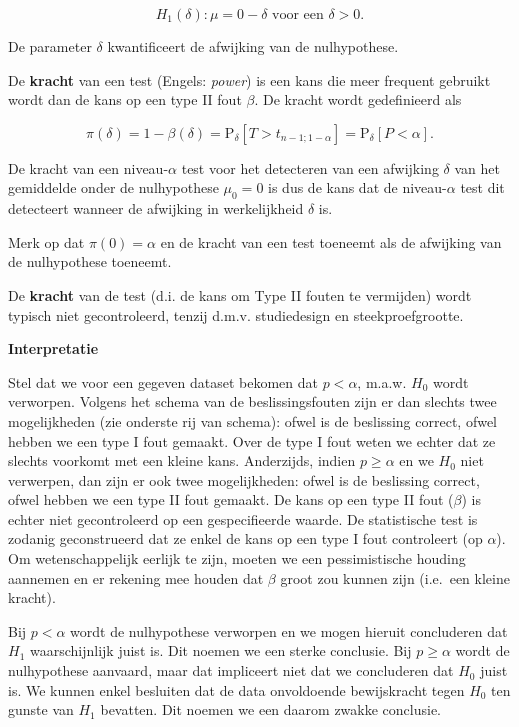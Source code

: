 \documentclass[
  12pt,dutch]{book}
\theoremstyle{definition}
\theoremstyle{definition}
\theoremstyle{definition}
\theoremstyle{definition}
\theoremstyle{remark}
\begin{document}
\[H_1(\delta): \mu=0-\delta \text{ voor een }\delta>0.\]

De parameter \(\delta\) kwantificeert de afwijking van de nulhypothese.

De \textbf{kracht} van een test (Engels: \emph{power}) is een kans die meer frequent gebruikt wordt dan de kans op een type II fout \(\beta\). De kracht wordt gedefinieerd als

\[\pi(\delta) = 1-\beta(\delta) = \text{P}_\delta\left[T>t_{n-1;1-\alpha}\right]=\text{P}_\delta\left[P<\alpha\right].\]

De kracht van een niveau-\(\alpha\) test voor het detecteren van een afwijking \(\delta\) van het gemiddelde onder de nulhypothese \(\mu_0=0\) is dus de kans dat de niveau-\(\alpha\) test dit detecteert wanneer de afwijking in werkelijkheid \(\delta\) is.

Merk op dat \(\pi(0)=\alpha\) en de kracht van een test toeneemt als de afwijking van de nulhypothese toeneemt.

De \textbf{kracht} van de test (d.i. de kans om Type II fouten te vermijden) wordt typisch niet gecontroleerd, tenzij d.m.v. studiedesign en steekproefgrootte.

\textbf{Interpretatie}

Stel dat we voor een gegeven dataset bekomen dat \(p<\alpha\), m.a.w. \(H_0\) wordt verworpen. Volgens het schema van de beslissingsfouten zijn er dan slechts twee mogelijkheden (zie onderste rij van schema): ofwel is de beslissing correct, ofwel hebben we een type I fout gemaakt. Over de type I fout weten we echter dat ze slechts voorkomt met een kleine kans.
Anderzijds, indien \(p\geq \alpha\) en we \(H_0\) niet verwerpen, dan zijn er ook twee mogelijkheden: ofwel is de beslissing correct, ofwel hebben we een type II fout gemaakt. De kans op een type II fout (\(\beta\)) is echter niet gecontroleerd op een gespecifieerde waarde. De statistische test is zodanig geconstrueerd dat ze enkel de kans op een type I fout controleert (op \(\alpha\)). Om wetenschappelijk eerlijk te zijn, moeten we een pessimistische houding aannemen en er rekening mee houden dat \(\beta\) groot zou kunnen zijn (i.e.~een kleine kracht).

Bij \(p < \alpha\) wordt de nulhypothese verworpen en we mogen hieruit concluderen dat \(H_1\) waarschijnlijk juist is. Dit noemen we een sterke conclusie.
Bij \(p\geq \alpha\) wordt de nulhypothese aanvaard, maar dat impliceert niet dat we concluderen dat \(H_0\) juist is. We kunnen enkel besluiten dat de data onvoldoende bewijskracht tegen \(H_0\) ten gunste van \(H_1\) bevatten. Dit noemen we een daarom zwakke conclusie.
\end{document}

